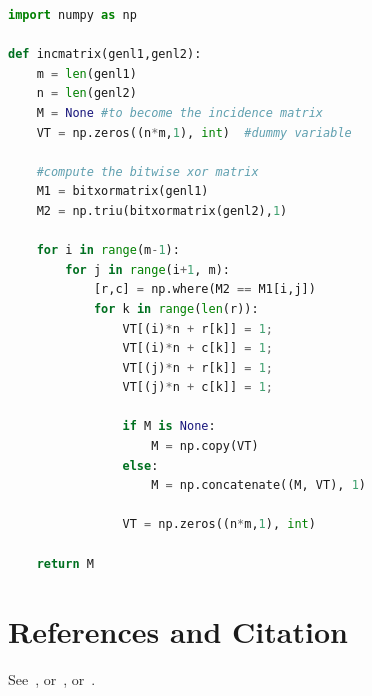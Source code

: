 \documentclass[a4paper]{article}
\theoremstyle{definition}
\theoremstyle{remark}
\numberwithin{equation}{section}
\begin{document}
\begin{lstlisting}[language=Python, caption=Python example]
import numpy as np
 
def incmatrix(genl1,genl2):
    m = len(genl1)
    n = len(genl2)
    M = None #to become the incidence matrix
    VT = np.zeros((n*m,1), int)  #dummy variable
 
    #compute the bitwise xor matrix
    M1 = bitxormatrix(genl1)
    M2 = np.triu(bitxormatrix(genl2),1) 
 
    for i in range(m-1):
        for j in range(i+1, m):
            [r,c] = np.where(M2 == M1[i,j])
            for k in range(len(r)):
                VT[(i)*n + r[k]] = 1;
                VT[(i)*n + c[k]] = 1;
                VT[(j)*n + r[k]] = 1;
                VT[(j)*n + c[k]] = 1;
 
                if M is None:
                    M = np.copy(VT)
                else:
                    M = np.concatenate((M, VT), 1)
 
                VT = np.zeros((n*m,1), int)
 
    return M
\end{lstlisting}

\section{References and Citation}

See~\cite{article1}, or~\cite{article2}, or~\cite{article3}.



\end{document}
